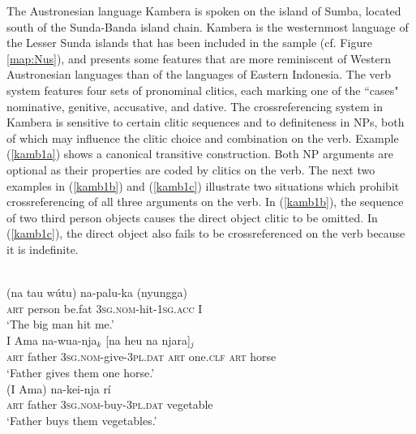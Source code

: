 The Austronesian language Kambera is spoken on the island of Sumba, located south of the Sunda-Banda island chain. Kambera is the westernmost language of the Lesser Sunda islands that has been included in the sample (cf. Figure \ref{map:Nus}), and presents some features that are more reminiscent of Western Austronesian languages than of the languages of Eastern Indonesia. The verb system features four sets of pronominal clitics, each marking one of the ``cases" nominative, genitive, accusative, and dative. The crossreferencing system in Kambera is sensitive to certain clitic sequences and to definiteness in NPs, both of which may influence the clitic choice and combination on the verb. Example (\ref{kamb1a}) shows a canonical transitive construction. Both NP arguments are optional as their properties are coded by clitics on the verb. The next two examples in (\ref{kamb1b}) and (\ref{kamb1c}) illustrate two situations which prohibit crossreferencing of all three arguments on the verb. In (\ref{kamb1b}), the sequence of two third person objects causes the direct object clitic to be omitted. In (\ref{kamb1c}), the direct object also fails to be crossreferenced on the verb because it is indefinite.

\ea 
{}\\
\ea \label{kamb1a}
\gll (na tau wútu) na-palu-ka (nyungga) \\
\textsc{art} person be.fat \textsc{3}\textsc{sg}.\textsc{nom}-hit-\textsc{1}\textsc{sg}.\textsc{acc} I \\
\glft `The big man hit me.' \\ 
\ex \label{kamb1b}
\gll I Ama na-wua-nja$_k$ [na heu na njara]$_j$ \\
\textsc{art} father \textsc{3}\textsc{sg}.\textsc{nom}-give-\textsc{3}\textsc{pl}.\textsc{dat} \textsc{art} one.\textsc{clf} \textsc{art} horse \\
\glft `Father gives them one horse.' \\ 
\ex \label{kamb1c}
\gll (I Ama) na-kei-nja rí \\ 
\textsc{art} father \textsc{3}\textsc{sg}.\textsc{nom}-buy-\textsc{3}\textsc{pl}.\textsc{dat} vegetable \\
\glft `Father buys them vegetables.'\\ 
\z
\z

